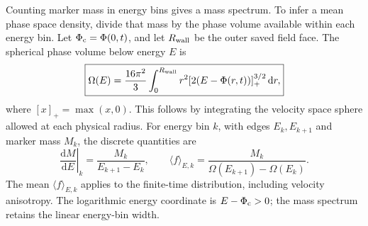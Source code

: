 Counting marker mass in energy bins gives a mass spectrum. To infer a mean
phase space density, divide that mass by the phase volume available within
each energy bin. Let $\Phi_{\rm c}=\Phi(0,t)$, and let $R_{\rm wall}$ be the outer saved
field face. The spherical phase volume below energy $E$ is
\begin{equation}
 \boxed{\Omega(E)=\frac{16\pi^2}{3}
 \int_0^{R_{\rm wall}}r^2[2(E-\Phi(r,t))]_+^{3/2}\,\mathrm dr,}
 \label{eq:df-analysis-phase-volume}
\end{equation}
where $[x]_+=\max(x,0)$. This follows by integrating the velocity space
sphere allowed at each physical radius. For energy bin $k$, with edges
$E_k,E_{k+1}$ and marker mass $M_k$, the discrete quantities are
\begin{equation}
 \boxed{\left.\frac{\mathrm dM}{\mathrm dE}\right|_k
 =\frac{M_k}{E_{k+1}-E_k},\qquad
 \langle f\rangle_{E,k}=\frac{M_k}{\Omega(E_{k+1})-\Omega(E_k)}.}
 \label{eq:df-analysis-energy-bin}
\end{equation}
The mean $\langle f\rangle_{E,k}$ applies to the finite-time distribution,
including velocity anisotropy. The logarithmic energy coordinate is
$E-\Phi_{\rm c}>0$; the mass spectrum retains the linear energy-bin width.

